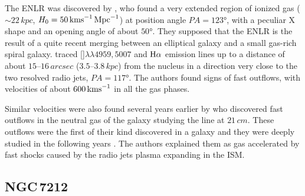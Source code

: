 \documentclass[../main.tex]{subfiles}
\begin{document}
The ENLR was discovered by \citet{Colina91}, who found a very extended region of ionized gas ($\sim 22\,\si{kpc}$, $H_0 =50\,\si{\kms.Mpc^{-1}}$) at position angle $PA = \ang{123}$, with a peculiar X shape and an opening angle of about $\ang{50}$. 
They supposed that the ENLR is the result of a quite recent merging between an elliptical galaxy and a small gas-rich spiral galaxy. 
\citet{Morganti07} traced []$\lambda\lambda4959, 5007$ and $\Ha$ emission lines up to a distance of about $15$--$16\,\si{arcsec}$ ($3.5$--$3.8\,\si{kpc}$) from the nucleus in a direction very close to the two resolved radio jets, $PA = \ang{117}$. 
The authors found signs of fast outflows, with velocities of about $600\,\si{\kms}$ in all the gas phases.

Similar velocities were also found several years earlier by \citet{Morganti98} who discovered fast outflows in the neutral gas of the galaxy studying the  line at $21\,\si{cm}$.
These outflows were the first of their kind discovered in a galaxy and they were deeply studied in the following years \citep{Morganti07,Tadhunter14,Morganti15}.
The authors explained them as gas accelerated by fast shocks caused by the radio jets plasma expanding in the ISM.


\subsection{NGC\,7212}
\label{sec:NGC7212}
\end{document}
